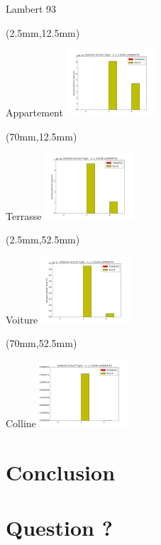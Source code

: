 \documentclass[10pt]{beamer}
\begin{document}
	\begin{frame}{Lambert 93}
	    \begin{textblock*}{60mm}(2.5mm,12.5mm)
	  		\begin{block}{Appartement}
				\includegraphics[width=125px]{../src/data/itinary_1/var_ecart_lambert1.png}
			\end{block}
  		\end{textblock*}

  		 \begin{textblock*}{60mm}(70mm,12.5mm)
  		 	\begin{block}{Terrasse}
				\includegraphics[width=125px]{../src/data/itinary_2/var_ecart_lambert2.png}
			\end{block}
  		\end{textblock*}

  		\begin{textblock*}{60mm}(2.5mm,52.5mm)
  		 	\begin{block}{Voiture}
				\includegraphics[width=125px]{../src/data/itinary_3/var_ecart_lambert3.png}
			\end{block}
  		\end{textblock*}


		\begin{textblock*}{60mm}(70mm,52.5mm)
			\begin{block}{Colline}
				\includegraphics[width=125px]{../src/data/itinary_4/var_ecart_lambert4.png}
			\end{block}
		\end{textblock*}
	\end{frame}

	\section{Conclusion}
	\section{Question ?}
\end{document}
